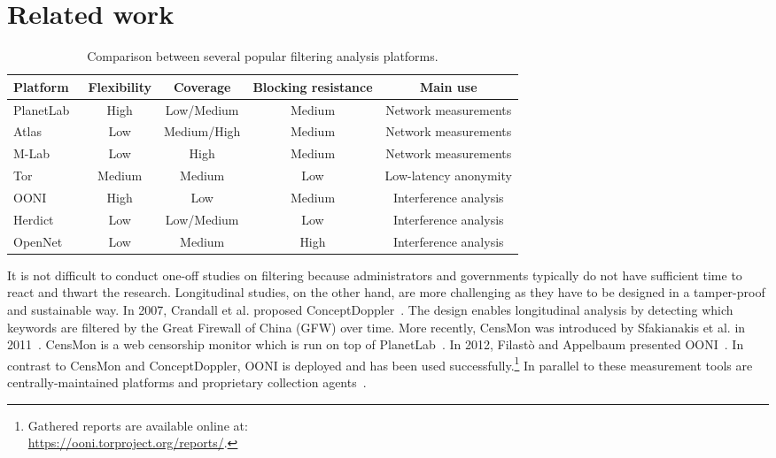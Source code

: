 \section{Related work}
\label{related_work}
\begin{table*}[ht!]
\centering
\begin{tabular}{l|cccc}
\textbf{Platform} & \textbf{Flexibility} & \textbf{Coverage} &
\textbf{Blocking resistance} & \textbf{Main use} \\
\hline 
PlanetLab~\cite{planetlab} & High & Low/Medium & Medium & Network measurements \\
Atlas~\cite{atlas} & Low & Medium/High & Medium & Network measurements \\
M-Lab~\cite{dovrolis2010measurement} & Low & High & Medium & Network measurements \\
Tor~\cite{Dingledine2004} & Medium & Medium & Low & Low-latency anonymity \\
OONI~\cite{Filasto2012} & High & Low & Medium & Interference analysis \\
Herdict~\cite{Herdict} & Low & Low/Medium & Low & Interference analysis \\
OpenNet~\cite{opennet} & Low & Medium & High & Interference analysis \\
\hline 
\end{tabular} 
\caption{Comparison between several popular filtering analysis platforms.}
\label{tab:comparison}
\end{table*}

It is not difficult to conduct one-off studies on filtering because administrators and governments
typically do not have sufficient time to react and thwart the research.
Longitudinal studies, on the other hand, are more challenging as they have to
be designed in a tamper-proof and sustainable way.  In 2007, Crandall et al.
proposed ConceptDoppler~\cite{Crandall2007}.  The design enables longitudinal 
analysis by detecting which keywords are filtered by the Great
Firewall of China (GFW) over time.  More recently, CensMon was introduced by
Sfakianakis et al. in 2011~\cite{Sfakianakis2011}.  CensMon is a web censorship
monitor which is run on top of PlanetLab~\cite{planetlab}.  In
2012, Filast\`{o} and Appelbaum presented OONI~\cite{Filasto2012}.  In
contrast to CensMon and ConceptDoppler, OONI is deployed and has been used
successfully.\footnote{Gathered reports are available online at:\\
\url{https://ooni.torproject.org/reports/}.}  In parallel to these measurement tools 
are centrally-maintained platforms and proprietary collection agents~\cite{hwang2007herdict,opennet}.

